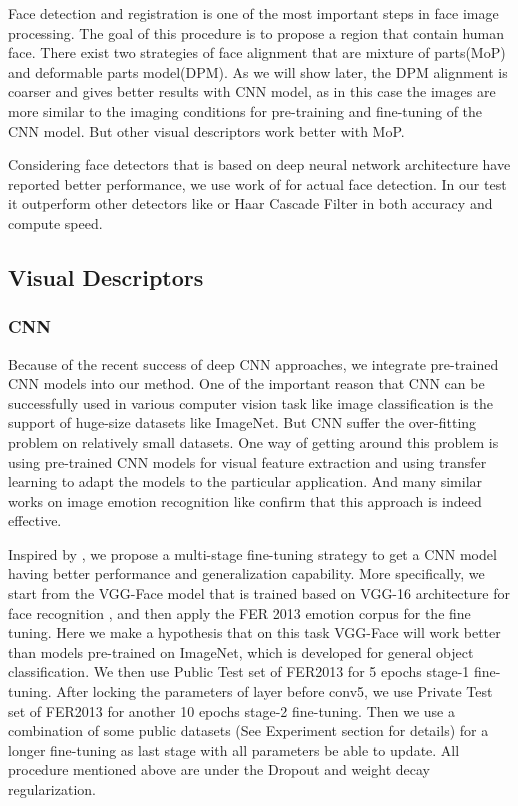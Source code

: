 \documentclass[conference]{IEEEtran}
\newcommand{\upcite}[1]{\textsuperscript{\cite{#1}}}
\begin{document}
Face detection and registration is one of the most important steps in face image processing. The goal of this procedure is to propose a region that contain human face. There exist two strategies of face alignment that are mixture of parts(MoP) and deformable parts model(DPM)\upcite{Kaya2017Video}. As we will show later, the DPM alignment is coarser and gives better results with CNN model, as in this case the images are more similar to the imaging conditions for pre-training and fine-tuning of the CNN model. But other visual descriptors work better with MoP.

Considering face detectors that is based on deep neural network architecture have reported better performance, we use work of \cite{MTCNN} for actual face detection. In our test it outperform other detectors like \cite{Chen2014Joint,Ramanan2012Face} or Haar Cascade Filter in both accuracy and compute speed.

\subsection{Visual Descriptors}
\subsubsection{CNN}
Because of the recent success of deep CNN approaches, we integrate pre-trained CNN models into our method. One of the important reason that CNN can be successfully used in various computer vision task like image classification is the support of huge-size datasets like ImageNet. But CNN suffer the over-fitting problem on relatively small datasets. One way of getting around this problem is using pre-trained CNN models for visual feature extraction and using transfer learning to adapt the models to the particular application.\cite{Ng2015Deep,Razavian2014CNN} And many similar works on image emotion recognition like \cite{Kim2016Hierarchical} confirm that this approach is indeed effective.

Inspired by \cite{Kaya2017Video}, we propose a multi-stage fine-tuning strategy to get a CNN model having better performance and generalization capability. More specifically, we start from the VGG-Face model that is trained based on VGG-16 architecture for face recognition \cite{VGGFace}, and then apply the FER 2013 \cite{Goodfeli-et-al-2013} emotion corpus for the fine tuning. Here we make a hypothesis that on this task VGG-Face will work better than models pre-trained on ImageNet, which is developed for general object classification. We then use Public Test set of FER2013 for 5 epochs stage-1 fine-tuning. After locking the parameters of layer before conv5, we use Private Test set of FER2013 for another 10 epochs stage-2 fine-tuning. Then we use a combination of some public datasets (See Experiment section for details) for a longer fine-tuning as last stage with all parameters be able to update. All procedure mentioned above are under the Dropout and weight decay regularization.
\end{document}
